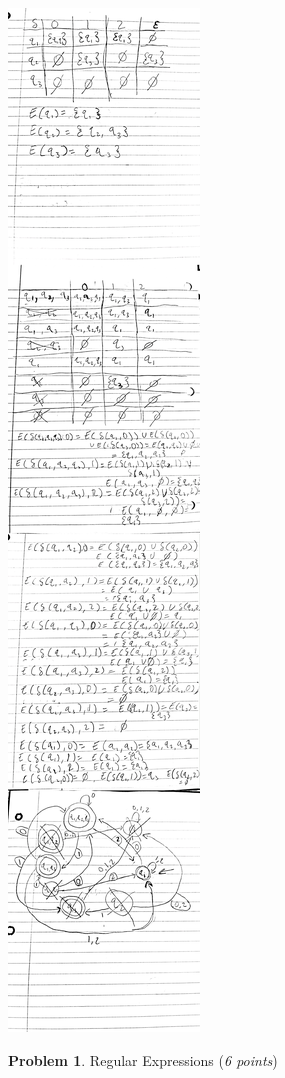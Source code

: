 \documentclass[11pt]{article}
\theoremstyle{definition}
\theoremstyle{theorem}
\newtheorem{prob}{Problem}
\begin{document}
\includegraphics[scale=0.1]{./p1_images/work.jpg}




\newpage

\begin{prob} Regular Expressions (\emph{6 points})\end{prob}
\end{document}
